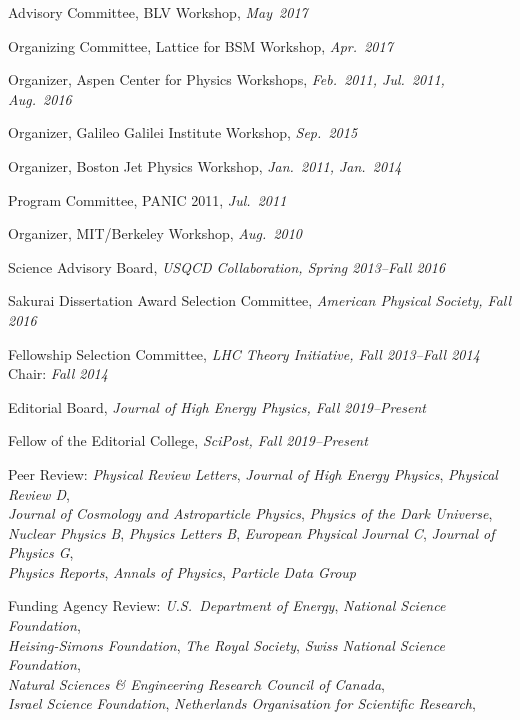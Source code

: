 \documentclass[11pt]{article}
\newcommand{\sh}{\phantom{...}}
\begin{document}
\item Advisory Committee, BLV Workshop, \textit{May~2017}
\item Organizing Committee, Lattice for BSM Workshop, \textit{Apr.~2017}
\item Organizer, Aspen Center for Physics Workshops, \textit{Feb.~2011, Jul.~2011, Aug.~2016}
\item Organizer, Galileo Galilei Institute Workshop, \textit{Sep.~2015}
\item Organizer, Boston Jet Physics Workshop, \textit{Jan.~2011, Jan.~2014}
\item Program Committee, PANIC 2011, \textit{Jul.~2011}
\item Organizer, MIT/Berkeley Workshop, \textit{Aug.~2010}
\item Science Advisory Board, \textit{USQCD Collaboration, Spring 2013--Fall 2016}
\item Sakurai Dissertation Award Selection Committee, \textit{American Physical Society, Fall 2016}
\item Fellowship Selection Committee, \textit{LHC Theory Initiative, Fall 2013--Fall 2014}
\\ \sh Chair: \textit{Fall 2014}
\item Editorial Board, \textit{Journal of High Energy Physics, Fall 2019--Present}
\item Fellow of the Editorial College, \textit{SciPost, Fall 2019--Present}
\item Peer Review:  \textit{Physical Review Letters}, \textit{Journal of High Energy Physics}, \textit{Physical Review D},
\\ \sh \textit{Journal of Cosmology and Astroparticle Physics}, \textit{Physics of the Dark Universe},
\\ \sh \textit{Nuclear Physics B}, \textit{Physics Letters B}, \textit{European Physical Journal C}, \textit{Journal of Physics G},
\\ \sh \textit{Physics Reports}, \textit{Annals of Physics}, \textit{Particle Data Group}
\item Funding Agency Review:  \textit{U.S.~Department of Energy},  \textit{National Science Foundation},
\\ \sh \textit{Heising-Simons Foundation}, \textit{The Royal Society}, \textit{Swiss National Science Foundation},
\\ \sh \textit{Natural Sciences \& Engineering Research Council of Canada},
\\ \sh  \textit{Israel Science Foundation}, \textit{Netherlands Organisation for Scientific Research},
\end{document}
